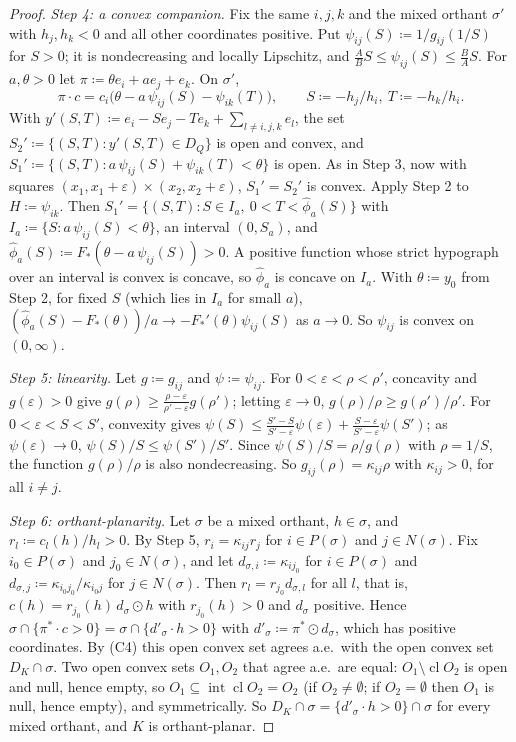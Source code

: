 \documentclass[11pt]{article}
\DeclareMathOperator{\cl}{cl}
\DeclareMathOperator{\inter}{int}
\theoremstyle{plain}
\theoremstyle{definition}
\theoremstyle{remark}
\begin{document}
\begin{proof}
\emph{Step 4: a convex companion.} Fix the same $i,j,k$ and the mixed orthant $\sigma'$
with $h_j,h_k<0$ and all other coordinates positive. Put $\psi_{ij}(S)\coloneqq
1/g_{ij}(1/S)$ for $S>0$; it is nondecreasing and locally Lipschitz, and $\frac AB S\le
\psi_{ij}(S)\le\frac BA S$. For $a,\theta>0$ let $\pi\coloneqq\theta e_i+ae_j+e_k$. On
$\sigma'$,
\[
  \pi\cdot c=c_i\bigl(\theta-a\,\psi_{ij}(S)-\psi_{ik}(T)\bigr),\qquad S\coloneqq
  -h_j/h_i,\ T\coloneqq-h_k/h_i .
\]
With $y'(S,T)\coloneqq e_i-Se_j-Te_k+\sum_{l\ne i,j,k}e_l$, the set $S_2'\coloneqq
\{(S,T):y'(S,T)\in D_Q\}$ is open and convex, and $S_1'\coloneqq\{(S,T):a\,\psi_{ij}(S)+
\psi_{ik}(T)<\theta\}$ is open. As in Step 3, now with squares $(x_1,x_1+\varepsilon)
\times(x_2,x_2+\varepsilon)$, $S_1'=S_2'$ is convex. Apply Step 2 to $H\coloneqq\psi_{ik}$.
Then $S_1'=\{(S,T):S\in I_a,\ 0<T<\hat\phi_a(S)\}$ with $I_a\coloneqq\{S:a\,\psi_{ij}(S)
<\theta\}$, an interval $(0,S_a)$, and $\hat\phi_a(S)\coloneqq F_\ast(\theta-a\,
\psi_{ij}(S))>0$. A positive function whose strict hypograph over an interval is convex
is concave, so $\hat\phi_a$ is concave on $I_a$. With $\theta\coloneqq y_0$ from Step 2,
for fixed $S$ (which lies in $I_a$ for small $a$), $(\hat\phi_a(S)-F_\ast(\theta))/a\to
-F_\ast'(\theta)\psi_{ij}(S)$ as $a\to0$. So $\psi_{ij}$ is convex on $(0,\infty)$.

\emph{Step 5: linearity.} Let $g\coloneqq g_{ij}$ and $\psi\coloneqq\psi_{ij}$. For
$0<\varepsilon<\rho<\rho'$, concavity and $g(\varepsilon)>0$ give $g(\rho)\ge
\frac{\rho-\varepsilon}{\rho'-\varepsilon}g(\rho')$; letting $\varepsilon\to0$,
$g(\rho)/\rho\ge g(\rho')/\rho'$. For $0<\varepsilon<S<S'$, convexity gives $\psi(S)\le
\frac{S'-S}{S'-\varepsilon}\psi(\varepsilon)+\frac{S-\varepsilon}{S'-\varepsilon}
\psi(S')$; as $\psi(\varepsilon)\to0$, $\psi(S)/S\le\psi(S')/S'$. Since
$\psi(S)/S=\rho/g(\rho)$ with $\rho=1/S$, the function $g(\rho)/\rho$ is also
nondecreasing. So $g_{ij}(\rho)=\kappa_{ij}\rho$ with $\kappa_{ij}>0$, for all $i\ne j$.

\emph{Step 6: orthant-planarity.} Let $\sigma$ be a mixed orthant, $h\in\sigma$, and
$r_l\coloneqq c_l(h)/h_l>0$. By Step 5, $r_i=\kappa_{ij}r_j$ for $i\in P(\sigma)$ and
$j\in N(\sigma)$. Fix $i_0\in P(\sigma)$ and $j_0\in N(\sigma)$, and let $d_{\sigma,i}
\coloneqq\kappa_{ij_0}$ for $i\in P(\sigma)$ and $d_{\sigma,j}\coloneqq\kappa_{i_0j_0}/
\kappa_{i_0j}$ for $j\in N(\sigma)$. Then $r_l=r_{j_0}d_{\sigma,l}$ for all $l$, that is,
$c(h)=r_{j_0}(h)\,d_\sigma\odot h$ with $r_{j_0}(h)>0$ and $d_\sigma$ positive. Hence
$\sigma\cap\{\pi^\ast\cdot c>0\}=\sigma\cap\{d'_\sigma\cdot h>0\}$ with $d'_\sigma
\coloneqq\pi^\ast\odot d_\sigma$, which has positive coordinates. By (C4) this open convex
set agrees a.e.\ with the open convex set $D_K\cap\sigma$. Two open convex sets $O_1,O_2$
that agree a.e.\ are equal: $O_1\setminus\cl O_2$ is open and null, hence empty, so
$O_1\subseteq\inter\cl O_2=O_2$ \cite[Thm.~6.3]{Rockafellar} (if $O_2\ne\emptyset$; if
$O_2=\emptyset$ then $O_1$ is null, hence empty), and symmetrically. So $D_K\cap\sigma=
\{d'_\sigma\cdot h>0\}\cap\sigma$ for every mixed orthant, and $K$ is orthant-planar.
\end{proof}
\end{document}
